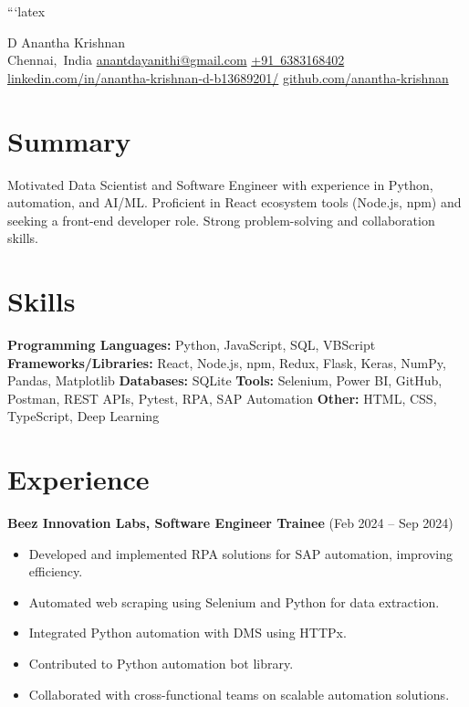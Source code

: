 ```latex
\begin{header}
    \fontsize{25 pt}{25 pt}\selectfont D Anantha Krishnan\\
    \vspace{5 pt}
    \normalsize
    \mbox{Chennai, India} \AND%
    \mbox{\href{mailto:anantdayanithi@gmail.com}{anantdayanithi@gmail.com}} \AND%
    \mbox{\href{tel:+91-6383168402}{+91 6383168402}} \AND%
    \mbox{\href{https://www.linkedin.com/in/anantha-krishnan-d-b13689201/}{linkedin.com/in/anantha-krishnan-d-b13689201/}} \AND%
    \mbox{\href{https://github.com/anantha-krishnan}{github.com/anantha-krishnan}}
\end{header}
\vspace{5 pt - 0.3 cm}

\section{Summary}
Motivated Data Scientist and Software Engineer \newline
with experience in Python, automation, and AI/ML.  \newline
Proficient in React ecosystem tools (Node.js, npm) \newline
and seeking a front-end developer role.  \newline
Strong problem-solving and collaboration skills.

\section{Skills}
\textbf{Programming Languages:} Python, JavaScript, SQL, \newline  VBScript
\textbf{Frameworks/Libraries:} React, Node.js, npm, Redux, \newline Flask, Keras, NumPy, Pandas, Matplotlib
\textbf{Databases:} SQLite
\textbf{Tools:} Selenium, Power BI, GitHub, Postman, \newline  REST APIs,  Pytest, RPA, SAP Automation
\textbf{Other:}  HTML, CSS, TypeScript,  Deep Learning


\section{Experience}
\textbf{Beez Innovation Labs, Software Engineer Trainee} (Feb 2024 – Sep 2024)
\begin{itemize}
    \item Developed and implemented RPA solutions for \newline SAP automation, improving efficiency.
    \item Automated web scraping using Selenium and \newline Python for data extraction.
    \item Integrated Python automation with DMS using \newline HTTPx.
    \item Contributed to Python automation bot library.
    \item Collaborated with cross-functional teams \newline on scalable automation solutions.
\end{itemize}

